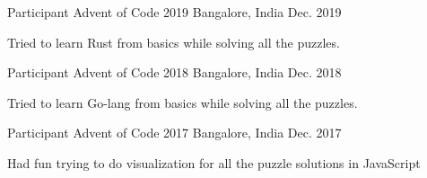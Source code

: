 

\begin{cventries}

  \cventry
    {Participant} %
    {Advent of Code 2019} %
    {Bangalore, India} %
    {Dec. 2019} %
    {
      \begin{cvitems} %
        \item {Tried to learn Rust from basics while solving all the puzzles.}
      \end{cvitems}
    }

  \cventry
    {Participant} %
    {Advent of Code 2018} %
    {Bangalore, India} %
    {Dec. 2018} %
    {
      \begin{cvitems} %
        \item {Tried to learn Go-lang from basics while solving all the puzzles.}
      \end{cvitems}
    }

  \cventry
    {Participant} %
    {Advent of Code 2017} %
    {Bangalore, India} %
    {Dec. 2017} %
    {
      \begin{cvitems} %
        \item {Had fun trying to do visualization for all the puzzle solutions in JavaScript}
      \end{cvitems}
    }

\end{cventries}
